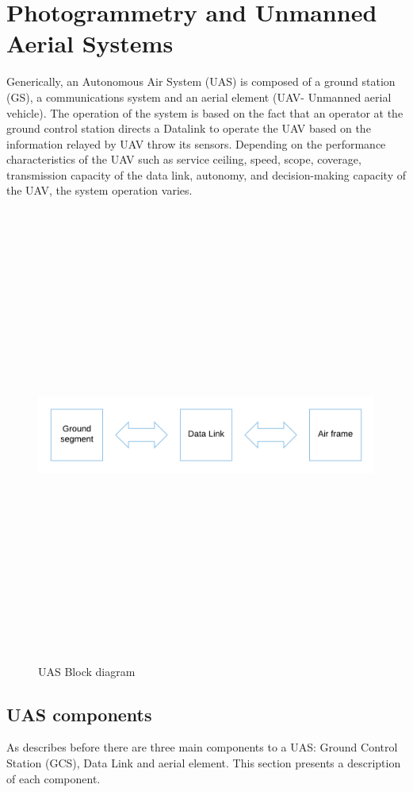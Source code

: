 \section{Photogrammetry and Unmanned Aerial Systems}
Generically, an Autonomous Air System (UAS) is composed of a ground station (GS), a communications system and an aerial element (UAV- Unmanned aerial vehicle). The operation of the system is based on the fact that an operator at the ground control station directs a Datalink to operate the UAV based on the information relayed by UAV throw its sensors. Depending on the performance characteristics of the UAV such as service ceiling, speed, scope, coverage, transmission capacity of the data link, autonomy, and decision-making capacity of the UAV, the system operation varies.\cite{Duran}
\begin{figure}[H]
\centering
\includegraphics[width=15cm,height=15cm,keepaspectratio]{imagenes/UAS_Components.png}
\caption{UAS Block diagram}
\label{fig:block diagram}
\end{figure}

\subsection{UAS components}
As describes before there are three main components to a UAS: Ground Control Station (GCS), Data Link and aerial element. This section presents a description of each component.
